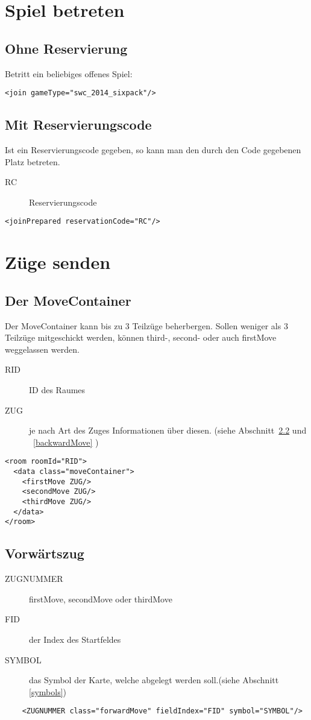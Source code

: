 \documentclass[12pt,a4paper, ngerman, oneside]{scrartcl}
\begin{document}
\section{Spiel betreten}
\subsection{Ohne Reservierung}
Betritt ein beliebiges offenes Spiel:
\begin{verbatim}
<join gameType="swc_2014_sixpack"/>
\end{verbatim}
\subsection{Mit Reservierungscode}
Ist ein Reservierungscode gegeben, so kann man den durch den Code gegebenen Platz betreten.
\begin{description}
\item[RC] Reservierungscode
\end{description}
\begin{verbatim}
<joinPrepared reservationCode="RC"/>
\end{verbatim}

\section{Züge senden}

\subsection{\label{moveContainer}Der MoveContainer}
Der MoveContainer kann bis zu 3 Teilzüge beherbergen. Sollen weniger als 3
Teilzüge mitgeschickt werden, können third-, second- oder auch firstMove
weggelassen werden.
\begin{description}
\item[RID] ID des Raumes
\item[ZUG] je nach Art des Zuges Informationen über diesen. (siehe
Abschnitt~\ref{forwardMove} und ~\ref{backwardMove} )
\end{description}
\begin{verbatim}
<room roomId="RID">
  <data class="moveContainer">
    <firstMove ZUG/>
    <secondMove ZUG/>
    <thirdMove ZUG/>
  </data>
</room>

\end{verbatim}
\subsection{Vorwärtszug}
\label{forwardMove}
\begin{description}
\item[ZUGNUMMER] firstMove, secondMove oder thirdMove
\item[FID] der Index des Startfeldes
\item[SYMBOL] das Symbol der Karte, welche abgelegt werden soll.(siehe
Abschnitt \ref{symbols})
\end{description}
\begin{verbatim}
	<ZUGNUMMER class="forwardMove" fieldIndex="FID" symbol="SYMBOL"/>
\end{verbatim}
\end{document}

